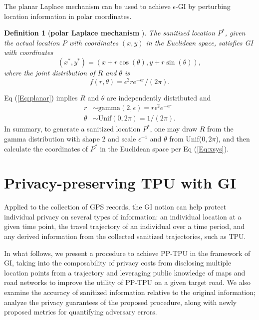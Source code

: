 \documentclass[10pt,journal,compsoc]{IEEEtran}
\newtheorem{defn}{Definition}
\begin{document}
The planar Laplace mechanism can be used to achieve $\epsilon$-GI by perturbing location information in polar coordinates.
\begin{defn}[\textbf{polar Laplace mechanism} \cite{andres2013geo}]\label{def:polar}
The sanitized location $P^*$,  given the actual location $P$ with coordinates $(x,y)$ in the Euclidean space, satisfies GI with coordinates
\begin{equation}\label{Eq:xsys}
(x^*,y^*)=(x+r\cos(\theta), y+r\sin(\theta)), 
\end{equation}
where  the joint distribution of $R$ and $\theta$ is
\begin{equation}\label{Eq:planar}
f(r,\theta)=\epsilon^{2}re^{-\epsilon r}/(2\pi).
\end{equation}
\end{defn}\vspace{-6pt}
Eq (\ref{Eq:planar}) implies $R$ and $\theta$ are independently distributed and 
\begin{align}
r&\sim\mbox{gamma}(2,\epsilon)=r\epsilon^2 e^{-\epsilon r}\label{Eq:r}\\
\theta&\sim\mbox{Unif}(0,2\pi)=1/(2\pi).\label{Eq:theta}
\end{align}
In summary, to generate a sanitized location $P^*$, one may draw $R$ from the gamma distribution with shape 2 and scale $\epsilon^{-1}$ and $\theta$ from Unif($0,2\pi$), and then calculate the coordinates of $P^*$ in the Euclidean space per Eq (\ref{Eq:xsys}).


\vspace{-9pt}\section{Privacy-preserving TPU with GI}\label{sec:method}\vspace{-3pt}
Applied to the collection of GPS records, the GI notion can help protect individual privacy on several types of information: an individual location at a given time point, the travel trajectory of an individual over a time period, and any derived information from the collected sanitized trajectories, such as TPU. 

In what follows, we present a procedure to achieve PP-TPU in the framework of GI, taking into the composability of privacy costs from disclosing multiple location points from a trajectory and leveraging public knowledge of maps and road networks to improve the utility of PP-TPU on a given target road. We also examine the accuracy of sanitized information relative to the original  information; analyze the privacy guarantees of the proposed procedure, along with newly proposed metrics for quantifying adversary errors. 
\end{document}

